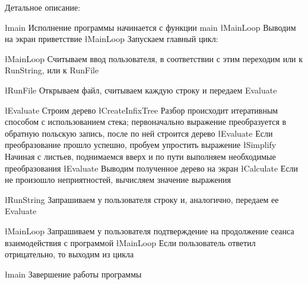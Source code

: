 Детальное описание:
\begin{enumerate}
  \l{main} Исполнение программы начинается с функции main
  \l{MainLoop} Выводим на экран приветствие
  \l{MainLoop} Запускаем главный цикл:
  \begin{enumerate}
    \l{MainLoop} Считываем ввод пользователя, в соответствии с этим переходим
    или к RunString, или к RunFile
    \begin{enumerate}
      \l{RunFile} Открываем файл, считываем каждую строку и передаем Evaluate
      \begin{enumerate}
      \l{Evaluate} Строим дерево
      \l{CreateInfixTree} Разбор происходит итеративным способом с
      использованием стека;
      первоначально выражение преобразуется в обратную польскую запись, после
      по ней строится дерево
      \l{Evaluate} Если преобразование прошло успешно, пробуем упростить
      выражение
      \l{Simplify} Начиная с листьев, поднимаемся вверх и по пути выполняем
      необходимые преобразования
      \l{Evaluate} Выводим полученное дерево на экран
      \l{Calculate} Если не произошло неприятностей, вычисляем значение
      выражения
      \end{enumerate}
      \l{RunString} Запрашиваем у пользователя строку и, аналогично, передаем
      ее Evaluate
    \end{enumerate}
    \l{MainLoop} Запрашиваем у пользователя подтверждение на продолжение
    сеанса взаимодействия с программой
    \l{MainLoop} Если пользователь ответил отрицательно, то выходим из
    цикла
  \end{enumerate}
  \l{main} Завершение работы программы
\end{enumerate}

\pagebreak

